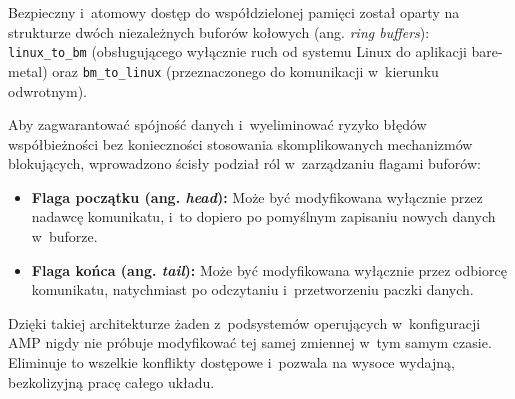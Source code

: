 Bezpieczny i~atomowy dostęp do współdzielonej pamięci został oparty na strukturze dwóch niezależnych buforów kołowych (ang. \textit{ring buffers}): \texttt{linux\_to\_bm} (obsługującego wyłącznie ruch od systemu Linux do aplikacji bare-metal) oraz \texttt{bm\_to\_linux} (przeznaczonego do komunikacji w~kierunku odwrotnym).

Aby zagwarantować spójność danych i~wyeliminować ryzyko błędów współbieżności bez konieczności stosowania skomplikowanych mechanizmów blokujących, wprowadzono ścisły podział ról w~zarządzaniu flagami buforów:
\begin{itemize}
    \item \textbf{Flaga początku (ang. \textit{head}):} Może być modyfikowana wyłącznie przez nadawcę komunikatu, i~to dopiero po pomyślnym zapisaniu nowych danych w~buforze.
    \item \textbf{Flaga końca (ang. \textit{tail}):} Może być modyfikowana wyłącznie przez odbiorcę komunikatu, natychmiast po odczytaniu i~przetworzeniu paczki danych.
\end{itemize}

Dzięki takiej architekturze żaden z~podsystemów operujących w~konfiguracji AMP nigdy nie próbuje modyfikować tej samej zmiennej w~tym samym czasie. Eliminuje to wszelkie konflikty dostępowe i~pozwala na wysoce wydajną, bezkolizyjną pracę całego układu.